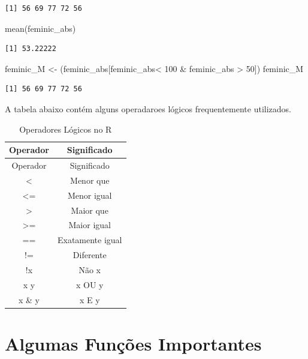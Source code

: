 \documentclass[
  letterpaper,
  DIV=11,
  numbers=noendperiod]{scrreprt}
\newenvironment{Shaded}{\begin{snugshade}}{\end{snugshade}}
\newcommand{\DecValTok}[1]{\textcolor[rgb]{0.68,0.00,0.00}{#1}}
\newcommand{\FunctionTok}[1]{\textcolor[rgb]{0.28,0.35,0.67}{#1}}
\newcommand{\NormalTok}[1]{\textcolor[rgb]{0.00,0.23,0.31}{#1}}
\newcommand{\OtherTok}[1]{\textcolor[rgb]{0.00,0.23,0.31}{#1}}
\newcommand{\SpecialCharTok}[1]{\textcolor[rgb]{0.37,0.37,0.37}{#1}}
\begin{document}
\begin{verbatim}
[1] 56 69 77 72 56
\end{verbatim}

\begin{Shaded}
\begin{Highlighting}[]
\FunctionTok{mean}\NormalTok{(feminic\_abs)}
\end{Highlighting}
\end{Shaded}

\begin{verbatim}
[1] 53.22222
\end{verbatim}

\begin{Shaded}
\begin{Highlighting}[]
\NormalTok{feminic\_M }\OtherTok{\textless{}{-}}\NormalTok{ (feminic\_abs[feminic\_abs}\SpecialCharTok{\textless{}} \DecValTok{100} \SpecialCharTok{\&}\NormalTok{ feminic\_abs }\SpecialCharTok{\textgreater{}} \DecValTok{50}\NormalTok{])}
\NormalTok{feminic\_M}
\end{Highlighting}
\end{Shaded}

\begin{verbatim}
[1] 56 69 77 72 56
\end{verbatim}

A tabela abaixo contém alguns operadaroes lógicos frequentemente
utilizados.

\begin{longtable}[]{@{}cc@{}}
\caption{Operadores Lógicos no R}\tabularnewline
\toprule\noalign{}
Operador & Significado \\
\midrule\noalign{}
\endfirsthead
\toprule\noalign{}
Operador & Significado \\
\midrule\noalign{}
\endhead
\bottomrule\noalign{}
\endlastfoot
\textless{} & Menor que \\
\textless= & Menor igual \\
\textgreater{} & Maior que \\
\textgreater= & Maior igual \\
== & Exatamente igual \\
!= & Diferente \\
!x & Não x \\
x \textbar{} y & x OU y \\
x \& y & x E y \\
\end{longtable}

\section{Algumas Funções
Importantes}\label{algumas-funuxe7uxf5es-importantes}
\end{document}
